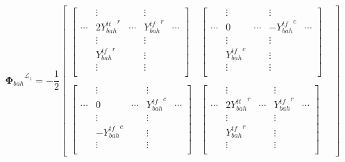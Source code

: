 \documentclass{article}
\begin{document}
\[
    {\mathbf{\Phi}_{bah}}^{\mathcal{L}_1} =
    -\frac{1}{2}
    \begin{bmatrix}
    \begin{bmatrix}
                & \vdots              &        & \vdots           &              \\
        \cdots  & 2 {Y^{tt}_{bah}}^r  & \cdots & {Y^{tf}_{bah}}^r & \cdots       \\
                & \vdots              &        & \vdots           &              \\
                & {Y^{tf}_{bah}}^r    &        & \vdots           &              \\
                & \vdots              &        & \vdots           &              \\
    \end{bmatrix} &
    \begin{bmatrix}
                & \vdots            &        & \vdots               &              \\
        \cdots  & 0                 & \cdots & -{Y^{tf}_{bah}}^c    & \cdots\\
                & \vdots            &        & \vdots               &              \\
                & {Y^{tf}_{bah}}^c  &        & \vdots               &              \\
                & \vdots            &        & \vdots               &              \\
    \end{bmatrix} \\ \\
    \begin{bmatrix}
                & \vdots            &        & \vdots               &              \\
        \cdots  & 0                 & \cdots & {Y^{tf}_{bah}}^c     & \cdots\\
                & \vdots            &        & \vdots               &              \\
                & -{Y^{tf}_{bah}}^c &        & \vdots               &              \\
                & \vdots            &        & \vdots               &              \\
    \end{bmatrix} &
    \begin{bmatrix}
                & \vdots                &        & \vdots           &              \\
        \cdots  & 2 {Y^{tt}_{bah}}^r    & \cdots & {Y^{tf}_{bah}}^r & \cdots       \\
                & \vdots                &        & \vdots           &              \\
                & {Y^{tf}_{bah}}^r      &        & \vdots           &              \\
                & \vdots                &        & \vdots           &              \\
    \end{bmatrix} &
    \end{bmatrix}
\]
\end{document}
